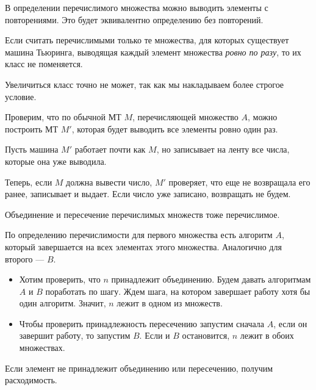 \begin{probl}
    В определении перечислимого множества можно выводить элементы с повторениями. Это будет эквивалентно определению без повторений. 
\end{probl}
\begin{thm}
	Если считать перечислимыми только те множества, для которых существует машина Тьюринга, выводящая каждый элемент множества \textit{ровно по разу}, то их класс не поменяется.
\end{thm}
\begin{proof*}
	Увеличиться класс точно не может, так как мы накладываем более строгое условие.

	Проверим, что по обычной МТ $ M$, перечисляющей множество $ A$, можно построить МТ $ M'$, которая будет выводить все элементы ровно один раз.

	Пусть машина $ M'$ работает почти как $ M$, но записывает на ленту все числа, которые она уже выводила.

	Теперь, если $ M$ должна вывести число, $ M'$ проверяет, что еще не возвращала его ранее, записывает и выдает.
	Если число уже записано, возвращать не будем.
\end{proof*}

\begin{thm}
    Объединение и пересечение перечислимых множеств тоже перечислимое.
\end{thm}
\begin{proof*}
    По определению перечислимости для первого множества есть алгоритм $ A$, который завершается на всех элементах этого множества. Аналогично для второго --- $ B$.

    \begin{itemize}
	\item Хотим проверить, что $ n$ принадлежит объединению. Будем давать алгоритмам  $ A$ и $ B$ поработать по шагу. Ждем шага, на котором завершает работу хотя бы один алгоритм. Значит, $ n$ лежит в одном из множеств. 
	\item Чтобы проверить принадлежность пересечению запустим сначала $ A$, если он завершит работу, то запустим $ B$. Если и $ B$ остановится, $ n $ лежит в обоих множествах.
    \end{itemize}
    Если элемент не принадлежит объединению или пересечению, получим расходимость.
\end{proof*}


